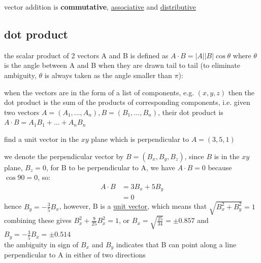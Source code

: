 \documentclass[a4paper,12pt]{article}
\begin{document}
vector addition is \textbf{commutative}, \href{20220923212917-associative.org}{associative} and \href{20220923212922-distributive.org}{distributive}\\
\subsection{dot product}
\label{sec:org7fafbe9}
\begin{definition}
the scalar product of 2 vectors A and B is defined as \(A \cdot B = |A||B|\cos\theta\) where \(\theta\) is the angle between A and B when they are drawn tail to tail (to eliminate ambiguity, \(\theta\) is always taken as the angle smaller than \(\pi\)):\\
\begin{center}

\end{center}

when the vectors are in the form of a list of components, e.g. \((x,y,z)\) then the dot product is the sum of the products of corresponding components, i.e. given two vectors \(A=(A_1,\dots,A_n),B=(B_1,\dots,B_n)\), their dot product is \(A\cdot B=A_1B_1+\dots+A_nB_n\)\\

\begin{question}
find a unit vector in the \(xy\) plane which is perpendicular to \(A=(3,5,1)\)\\
\begin{answer}
we denote the perpendicular vector by \(B=(B_x,B_y,B_z)\), since \(B\) is in the \(xy\) plane, \(B_z=0\), for B to be perpendicular to A, we have \(A\cdot B=0\) because \(\cos90=0\), so:\\
\begin{align*}
  A \cdot B &= 3B_x + 5B_y\\
  &= 0
\end{align*}
hence \(B_y=-\frac{3}{5}B_x\), however, B is a \hyperref[sec:orgc00677a]{unit vector}, which means that \(\sqrt{B_x^2+B_y^2}=1\)\\
combining these gives \(B_x^2+\frac{9}{25}B_x^2=1\), or \(B_x=\sqrt{\frac{25}{34}}=\pm0.857\) and \(B_y=-\frac{3}{5}B_x=\pm0.514\)\\
the ambiguity in sign of \(B_x\) and \(B_y\) indicates that B can point along a line perpendicular to A in either of two directions\\
\end{answer}
\end{question}
\end{definition}
\end{document}
